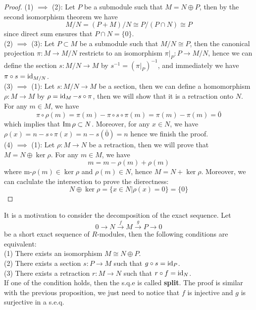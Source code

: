 \documentclass[12pt,a4paper]{article}
\begin{document}
\begin{proof}
    (1) \(\implies\) (2): Let \(P\) be a submodule such that \(M = N \oplus P\), then by the second isomorphism theorem we have
    \[M/N = (P+M)/N \cong P/(P \cap N) \cong P\]
    since direct sum ensures that \(P \cap N = \{0\}\).\\

    (2) \(\implies\) (3): Let \(P \subset M\) be a submodule such that \(M/N \cong P\), then the canonical projection \(\pi: M \to M/N\) restricts to an isomorphism \(\pi|_P: P \to M/N\), hence we can define the section \(s: M/N \to M\) by \(s^{-1} = (\pi|_P)^{-1}\), and immediately we have \(\pi \circ s = \operatorname{id}_{M/N}\).\\

    (3) \(\implies\) (1): Let \(s: M/N \to M\) be a section, then we can define a homomorphism \(\rho: M \to M\) by \(\rho = \operatorname{id}_M - s \circ \pi\), then we will show that it is a retraction onto \(N\). For any \(m \in M\), we have 
    \[\pi\circ\rho(m) = \pi(m) - \pi \circ s \circ \pi(m) = \pi(m) -\pi(m) = \bar{0}\]
    which implies that \(\operatorname{Im} \rho \subset N\). Moreover, for any \(x \in N\), we have \(\rho(x) = n - s\circ\pi(x) = n - s(\bar{0}) = n \)
    hence we finish the proof.\\

    (4) \(\implies\) (1): Let \(\rho: M \to N\) be a retraction, then we will prove that \(M = N \oplus \ker \rho\). For any \(m \in M\), we have
    \[m = m-\rho(m) + \rho(m)\]
    where m-\(\rho(m) \in \ker \rho\) and \(\rho(m) \in N\), hence \(M = N + \ker \rho\). Moreover, we can caclulate the intersection to prove the dierectness:
    \[N \oplus \ker\rho = \{x \in N | \rho(x) = 0\} = \{0\}\]
\end{proof}

\begin{remark}
    It is a motivation to consider the decomposition of the exact sequence. Let
    \[0 \longrightarrow N 
\xrightarrow{f} 
M 
\xrightarrow{g} 
P 
\longrightarrow 0
\]
    be a short exact sequence of \(R\)-modules, then the following conditions are equivalent:\\
    (1) There exists an isomorphism \(M \cong N \oplus P\).\\
    (2) There exists a section \(s: P \to M\) such that \(g \circ s = \operatorname{id}_P\).\\
    (3) There exists a retraction \(r: M \to N\) such that \(r \circ f = \operatorname{id}_N\).\\
    If one of the condition holds, then the s.q.e is called \textbf{split}. The proof is similar with the previous proposition, we just need to notice that \(f\) is injective and \(g\) is surjective in a s.e.q.
\end{remark}
\end{document}
